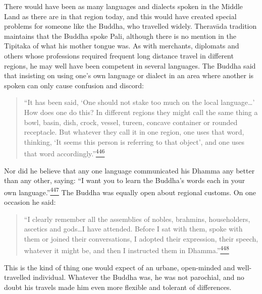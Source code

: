 There would have been as many languages and dialects spoken in the
Middle Land as there are in that region today, and this would have
created special problems for someone like the Buddha, who travelled
widely. Theravāda tradition maintains that the Buddha spoke Pali,
although there is no mention in the Tipitaka of what his mother tongue
was. As with merchants, diplomats and others whose professions required
frequent long distance travel in different regions, he may well have
been competent in several languages. The Buddha said that insisting on
using one's own language or dialect in an area where another is spoken
can only cause confusion and discord:

\begin{quote}
``It has been said, `One should not stake too much on the local
language\ldots' How does one do this? In different regions they might
call the same thing a bowl, basin, dish, crock, vessel, tureen, concave
container or rounded receptacle. But whatever they call it in one
region, one uses that word, thinking, `It seems this person is referring
to that object', and one uses that word
accordingly.''\label{footprints_split_012.html_fnref446}\hyperref[footprints_split_025.htmlux5cux23fn446]{\textsuperscript{446}}
\end{quote}

Nor did he believe that any one language communicated his Dhamma any
better than any other, saying: ``I want you to learn the Buddha's words
each in your own
language.''\label{footprints_split_012.html_fnref447}\hyperref[footprints_split_025.htmlux5cux23fn447]{\textsuperscript{447}}
The Buddha was equally open about regional customs. On one occasion he
said:

\begin{quote}
``I clearly remember all the assemblies of nobles, brahmins,
householders, ascetics and gods\ldots I have attended. Before I sat with
them, spoke with them or joined their conversations, I adopted their
expression, their speech, whatever it might be, and then I instructed
them in
Dhamma.''\label{footprints_split_012.html_fnref448}\hyperref[footprints_split_025.htmlux5cux23fn448]{\textsuperscript{448}}
\end{quote}

This is the kind of thing one would expect of an urbane, open-minded and
well-travelled individual. Whatever the Buddha was, he was not
parochial, and no doubt his travels made him even more flexible and
tolerant of differences.

